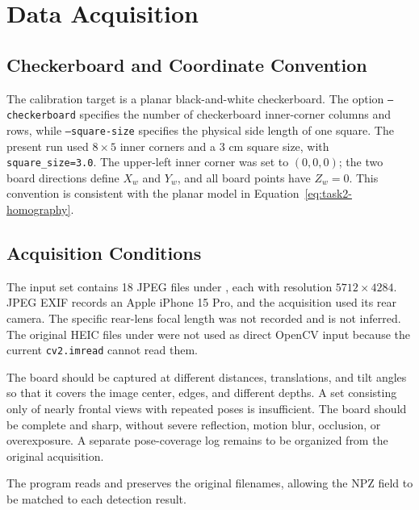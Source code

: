 \section{Data Acquisition}\label{sec:task2-data-collection}

\subsection{Checkerboard and Coordinate Convention}

The calibration target is a planar black-and-white checkerboard. The option
\texttt{--checkerboard} specifies the number of checkerboard inner-corner columns and rows, while
\texttt{--square-size} specifies the physical side length of one square. The present run used \(8\times5\) inner corners and a 3 cm square size, with \texttt{square\_size=3.0}. The upper-left inner corner was set to \((0,0,0)\); the two board directions define \(X_w\) and \(Y_w\), and all board points have \(Z_w=0\). This convention is consistent with the planar model in Equation~\ref{eq:task2-homography}.

\subsection{Acquisition Conditions}

The input set contains 18 JPEG files under , each with resolution
\(5712\times4284\). JPEG EXIF records an Apple iPhone 15 Pro, and the acquisition used its rear camera. The specific rear-lens focal length was not recorded and is not inferred. The original HEIC files under  were not used as direct OpenCV input because the current \texttt{cv2.imread} cannot read them.

The board should be captured at different distances, translations, and tilt angles so that it covers the image center, edges, and different depths. A set consisting only of nearly frontal views with repeated poses is insufficient. The board should be complete and sharp, without severe reflection, motion blur, occlusion, or overexposure. A separate pose-coverage log remains to be organized from the original acquisition.

The program reads  and preserves the original filenames, allowing the NPZ  field to be matched to each detection result.

